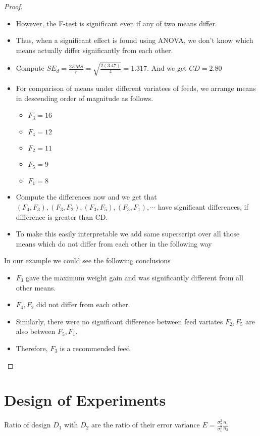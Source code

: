 \documentclass[oneside,11pt,pdftex]{book}%
\numberwithin{equation}{section}
\numberwithin{section}{chapter}
\numberwithin{equation}{chapter}
\begin{document}
\begin{proof}
	\begin{itemize}
		\item However, the F-test is significant even if any of two means differ.
		\item Thus, when a significant effect is found using ANOVA, we don't know which means actually differ significantly from each other.
		\item Compute $ SE_d=\frac{2 EMS}{r} = \sqrt{\frac{2(3.47)}{4}}=1.317$. And we get $ CD=2.80 $
		\item For comparison of means under different variatees of feeds, we arrange means in descending order of magnitude as follows.
		\begin{itemize}
			\item $ F_3=16 $
			\item $ F_4=12 $
			\item $ F_2=11 $
			\item $ F_5=9 $
			\item $ F_1=8 $
		\end{itemize}
		\item Compute the differences now and we get that $ (F_4,F_3),(F_3,F_2),(F_3,F_5),(F_3,F_1), \cdots $ have significant differences, if difference is greater than CD.
		\item To make this easily interpretable we add same superscript over all those means which do not differ from each other in the following way
	\end{itemize}
	In our example we could see the following conclusions
	\begin{itemize}
		\item $ F_3 $ gave the maximum weight gain and was significantly different from all other means.
		\item $ F_4, F_2 $ did not differ from each other.
		\item Similarly, there were no significant difference between feed variates $ F_2, F_5 $ are also between $ F_5, F_1. $
		\item Therefore, $ F_3 $ is a recommended feed.
	\end{itemize}
\end{proof}



\chapter{Design of Experiments}
Ratio of design $ D_1 $ with $ D_2 $ are the ratio of their error variance $ E=\frac{\sigma_2^2}{\sigma_1^2} \frac{n_1}{n_2}$
\end{document}
